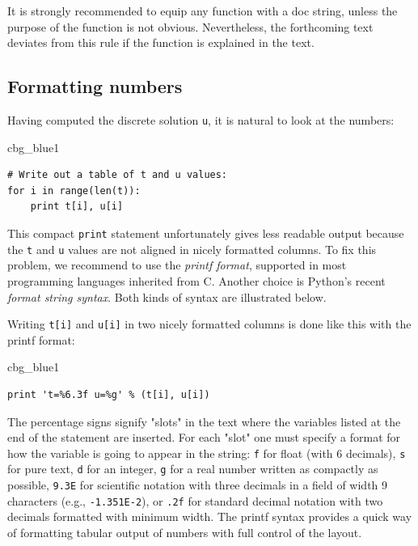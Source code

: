 \documentclass[%
oneside,                 %
final,                   %
10pt]{article}
\newenvironment{_cod_tight}[1]{
   \def\FrameCommand{\colorbox{#1}}
   \FrameRule0.6pt\MakeFramed {\FrameRestore}\vskip3mm}
   {\vskip0mm\endMakeFramed}
\newenvironment{cod}[1]{
\bgroup\rmfamily
\fboxsep=0mm\relax
\begin{_cod_tight}{#1}
\list{}{\parsep=-2mm\parskip=0mm\topsep=0pt\leftmargin=2mm
\rightmargin=2\leftmargin\leftmargin=4pt\relax}
\item\relax}
{\endlist\end{_cod_tight}\egroup}
\begin{document}
It is strongly recommended to equip any function with a doc string,
unless the purpose of the function
is not obvious. Nevertheless, the forthcoming
text deviates from this rule if the function is explained in the text.


\subsection{Formatting numbers}

Having computed the discrete solution \texttt{u}, it is natural to look at
the numbers:
\begin{cod}{cbg_blue1}\begin{Verbatim}[numbers=none,fontsize=\fontsize{9pt}{9pt},baselinestretch=0.95,xleftmargin=2mm]
# Write out a table of t and u values:
for i in range(len(t)):
    print t[i], u[i]
\end{Verbatim}
\end{cod}
\noindent
This compact \texttt{print} statement unfortunately gives less readable output
because the \texttt{t} and \texttt{u} values are not aligned in nicely formatted columns.
To fix this problem, we recommend to use the \emph{printf format}, supported in most
programming languages inherited from C. Another choice is
Python's recent \emph{format string syntax}. Both kinds of syntax are illustrated
below.


Writing \texttt{t[i]} and \texttt{u[i]} in two nicely formatted columns is done like
this with the printf format:

\begin{cod}{cbg_blue1}\begin{Verbatim}[numbers=none,fontsize=\fontsize{9pt}{9pt},baselinestretch=0.95,xleftmargin=2mm]
print 't=%6.3f u=%g' % (t[i], u[i])
\end{Verbatim}
\end{cod}
\noindent
The percentage signs signify "slots" in the text where the variables
listed at the end of the statement are inserted. For each "slot" one
must specify a format for how the variable is going to appear in the
string: \texttt{f} for float (with 6 decimals),
\texttt{s} for pure text, \texttt{d} for an integer, \texttt{g} for a real number
written as compactly as possible, \texttt{9.3E} for scientific notation with
three decimals in a field of width 9 characters (e.g., \texttt{-1.351E-2}),
or \texttt{.2f} for standard decimal notation with two decimals
formatted with minimum width. The printf syntax provides a quick way
of formatting tabular output of numbers with full control of the
layout.
\end{document}
